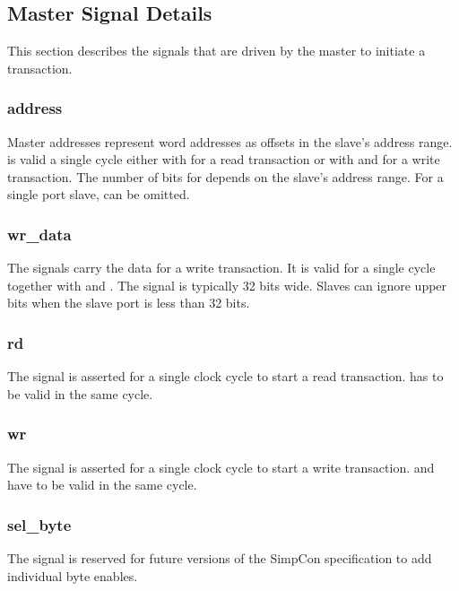 \subsection{Master Signal Details}

This section describes the signals that are driven by the master to
initiate a transaction.

\subsubsection{address}

Master addresses represent word addresses as offsets in the slave's
address range.  is valid a single cycle either with
 for a read transaction or with  and
 for a write transaction. The number of bits for
 depends on the slave's address range. For a single
port slave,  can be omitted.

\subsubsection{wr\_data}

The  signals carry the data for a write transaction.
It is valid for a single cycle together with  and
. The signal is typically 32 bits wide. Slaves can ignore
upper bits when the slave port is less than 32 bits.

\subsubsection{rd}

The  signal is asserted for a single clock cycle to start a
read transaction.  has to be valid in the same cycle.

\subsubsection{wr}

The  signal is asserted for a single clock cycle to start a
write transaction.  and  have to be
valid in the same cycle.

\subsubsection{sel\_byte}

The  signal is reserved for future versions of the
SimpCon specification to add individual byte enables.

